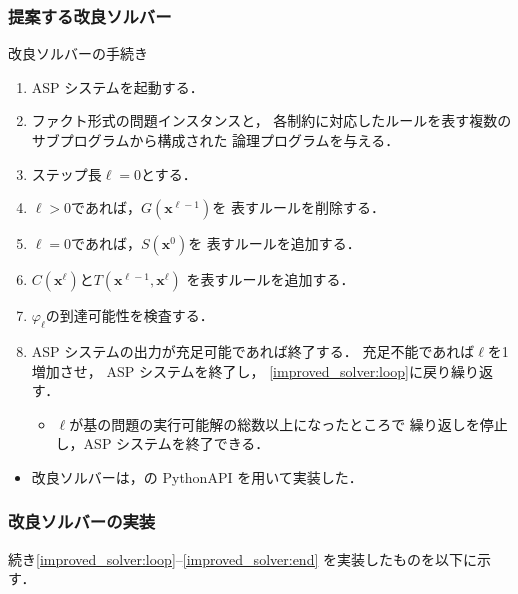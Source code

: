 \documentclass[dvipdfmx,11pt]{beamer}
\begin{document}
\begin{frame}\frametitle{提案する改良ソルバー}

  \begin{block}{改良ソルバーの手続き}
    \begin{enumerate}
      \item ASP システムを起動する．
      \item ファクト形式の問題インスタンスと，
            各制約に対応したルールを表す複数のサブプログラムから構成された
            論理プログラムを与える．
      \item ステップ長$\ell=0$とする．
      \item $\ell>0$であれば，$G(\bm{x}^{\ell -1})$を
            表すルールを削除する． \label{improved_solver:loop}
      \item $\ell=0$であれば，$S(\bm{x}^0)$を
            表すルールを追加する．
      \item $C(\bm{x}^{\ell})$と$T(\bm{x}^{\ell-1},\bm{x}^{\ell})$
            を表すルールを追加する．
      \item $\varphi_{\ell}$の到達可能性を検査する．
      \item ASP システムの出力が充足可能であれば終了する．
            充足不能であれば$\ell$を1増加させ，
            ASP システムを終了し，
            \ref{improved_solver:loop}に戻り繰り返す．
            \begin{itemize}
              \item $\ell$が基の問題の実行可能解の総数以上になったところで
                    繰り返しを停止し，ASP システムを終了できる．
            \end{itemize} \label{improved_solver:end}
    \end{enumerate}
  \end{block}

  \begin{itemize}
    \item 改良ソルバーは，{\clingo}の PythonAPI を用いて実装した．
  \end{itemize}

\end{frame}

\begin{frame}\frametitle{改良ソルバーの実装}

  続き\ref{improved_solver:loop}--\ref{improved_solver:end}
  を実装したものを以下に示す．
  \begin{exampleblock}{}
    
  \end{exampleblock}
  
\end{frame}
\end{document}
